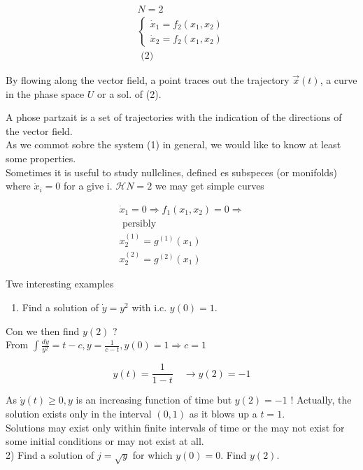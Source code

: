 \documentclass[10pt]{article}
\begin{document}
\begin{gather*}
N=2 \\
\left\{\begin{array}{l}
\dot{x}_{1}=f_{2}\left(x_{1}, x_{2}\right) \\
\dot{x}_{2}=f_{2}\left(x_{1}, x_{2}\right)
\end{array}\right.  \tag{2}\\
\text { (2) }
\end{gather*}


By flowing along the vector field, a point traces out the trajectory $\vec{x}(t)$, a curve in the phase space $U$ or a sol. of (2).

A phose partzait is a set of trajectories with the indication of the directions of the vector field.\\
As we commot sobre the system (1) in general, we would like to know at least some properties.\\
Sometimes it is useful to study nullclines, defined es subspeces (or monifolds) where $\dot{x}_{i}=0$ for a give i. $\mathcal{H} N=2$ we may get simple curves

$$
\begin{array}{r}
\dot{x}_{1}=0 \Rightarrow f_{1}\left(x_{1}, x_{2}\right)=0 \Rightarrow \\
\text { persibly } \\
x_{2}^{(1)}=g^{(1)}\left(x_{1}\right) \\
x_{2}^{(2)}=g^{(2)}\left(x_{1}\right)
\end{array}
$$

Twe interesting examples

\begin{enumerate}
  \item Find a solution of $\dot{y}=y^{2}$ with i.c. $y(0)=1$.
\end{enumerate}

Con we then find $y(2)$ ?\\
From $\int \frac{d y}{y^{2}}=t-c, y=\frac{1}{c-t}, y(0)=1 \Rightarrow c=1$

$$
y(t)=\frac{1}{1-t} \quad \rightarrow y(2)=-1
$$

As $\dot{y}(t) \geqslant 0, y$ is an increasing function of time but $y(2)=-1$ ! Actually, the solution exists only in the interval $(0,1)$ as it blows up a $t=1$.\\
Solutions may exist only within finite intervals of time or the may not exist for some initial conditions or may not exist at all.\\
2) Find a solution of $j=\sqrt{y}$ for which $y(0)=0$. Find $y(2)$.
\end{document}
